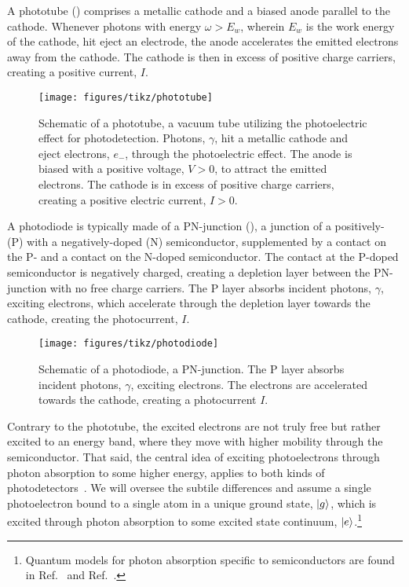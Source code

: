 A phototube () comprises a metallic cathode and a biased anode parallel to the cathode.
Whenever photons with energy $\omega>E_w$, wherein $E_w$ is the work energy of the cathode, hit eject an electrode, the anode accelerates the emitted electrons away from the cathode.
The cathode is then in excess of positive charge carriers, creating a positive current, $I$.
\begin{figure}[htb]
    \centering
    \texttt{[image: figures/tikz/phototube]}
    \caption{Schematic of a phototube, a vacuum tube utilizing the photoelectric effect for photodetection. Photons, $\gamma$, hit a metallic cathode and eject electrons, $e_-$, through the photoelectric effect. The anode is biased with a positive voltage, $V>0$, to attract the emitted electrons. The cathode is in excess of positive charge carriers, creating a positive electric current, $I>0$.}\label{fig:phototube}
\end{figure}
A photodiode is typically made of a PN-junction (), a junction of a positively- (P) with a negatively-doped (N) semiconductor, supplemented by a contact on the P- and a contact on the N-doped semiconductor.
The contact at the P-doped semiconductor is negatively charged, creating a depletion layer between the PN-junction with no free charge carriers.
The P layer absorbs incident photons, $\gamma$, exciting electrons, which accelerate through the depletion layer towards the cathode, creating the photocurrent, $I$.
\begin{figure}[htb]
    \centering
    \texttt{[image: figures/tikz/photodiode]}
    \caption{Schematic of a photodiode, a PN-junction. The P layer absorbs incident photons, $\gamma$, exciting electrons. The electrons are accelerated towards the cathode, creating a photocurrent $I$.}\label{fig:photodiode}
\end{figure}
Contrary to the phototube, the excited electrons are not truly free but rather excited to an energy band, where they move with higher mobility through the semiconductor.
That said, the central idea of exciting photoelectrons through photon absorption to some higher energy, applies to both kinds of photodetectors~\cite[p.~128]{Cohen1992}.
We will oversee the subtile differences and assume a single photoelectron bound to a single atom in a unique ground state, $\lvert g\rangle$, which is excited through photon absorption to some excited state continuum, $\lvert e\rangle$.\footnote{Quantum models for photon absorption specific to semiconductors are found in Ref.~\cite{Hoyer2002} and Ref.~\cite{Rossi2002}.}

